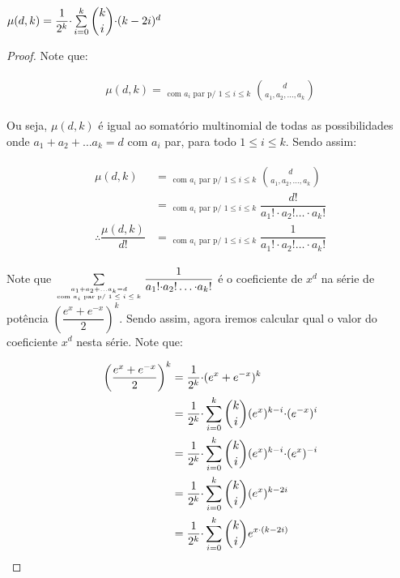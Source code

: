 \documentclass[12pt]{article}
\begin{document}
{ \begin{lema}
 	\label{lema6}
 	$\mu(d, k) = \dfrac{1}{2^k} {\cdot} \sum\limits_{i = 0}^{k} \escolhe{k}{i} {\cdot} (k - 2i)^{d}$
 \end{lema}
 
 \begin{proof} 
 	Note que: \newl
 	
 	\begin{align}
 		\begin{split}
 			\mu(d, k) =  \mathop{\sum_{a_1 + a_2 + \ldots a_k = d}}_{\text{com $a_i$ par p/ $1 \leq i \leq k$}}\binom{d}{a_1, a_2, \ldots, a_k} 
 		\end{split} 
 	\end{align}
 	
 	Ou seja, $\mu(d, k)$ é igual ao somatório multinomial de todas as possibilidades onde $a_1 + a_2 + \ldots a_k = d$ com $a_i$ par, para todo $1 \leq i \leq k$. Sendo assim:
 	
 	\begin{align}
 		\begin{split}
 			\label{l6_1}
 			\mu(d, k) &=  \mathop{\sum_{a_1 + a_2 + \ldots a_k = d}}_{\text{com $a_i$ par p/ $1 \leq i \leq k$}}\binom{d}{a_1, a_2, \ldots, a_k} \\
 			&= \mathop{\sum_{a_1 + a_2 + \ldots a_k = d}}_{\text{com $a_i$ par p/ $1 \leq i \leq k$}}\dfrac{d!}{a_1! {\cdot} a_2! \ldots {\cdot} a_k!} \\
 			\therefore \dfrac{\mu(d, k)}{d!} &= \mathop{\sum_{a_1 + a_2 + \ldots a_k = 2}}_{\text{com $a_i$ par p/ $1 \leq i \leq k$}}\dfrac{1}{a_1! {\cdot} a_2! \ldots {\cdot} a_k!}
 		\end{split} 
 	\end{align}

 
 Note que $\sum\limits_{a_1 + a_2 + \ldots a_k = d \atop \text{com $a_i$ par p/ $1 \leq i \leq k$}} \dfrac{1}{a_1! {\cdot} a_2! \ldots {\cdot} a_k!}$ é o coeficiente de $x^{d}$ na série de potência $\left(\dfrac{e^x + e^{-x}}{2}\right)^k$. Sendo assim, agora iremos calcular qual o valor do coeficiente $x^{d}$ nesta série. Note que:
 
 \begin{align}
 	\begin{split}
 		\label{l6_2}
 		\left(\dfrac{e^x + e^{-x}}{2}\right)^k &= \dfrac{1}{2^k} {\cdot} (e^x + e^{-x})^k \\
 		&= \dfrac{1}{2^k} {\cdot} \sum\limits_{i = 0}^{k}\escolhe{k}{i}(e^x)^{k-i} {\cdot} (e^{-x})^i \\
 		&= \dfrac{1}{2^k} {\cdot} \sum\limits_{i = 0}^{k}\escolhe{k}{i}(e^x)^{k-i} {\cdot} (e^{x})^{-i} \\
 		&= \dfrac{1}{2^k} {\cdot} \sum\limits_{i = 0}^{k}\escolhe{k}{i}(e^x)^{k-2i}  \\
 		&= \dfrac{1}{2^k} {\cdot} \sum\limits_{i = 0}^{k}\escolhe{k}{i}e^{x {\cdot}(k - 2i)}
 	\end{split} 
 \end{align}
 

\end{proof}}
\end{document}
